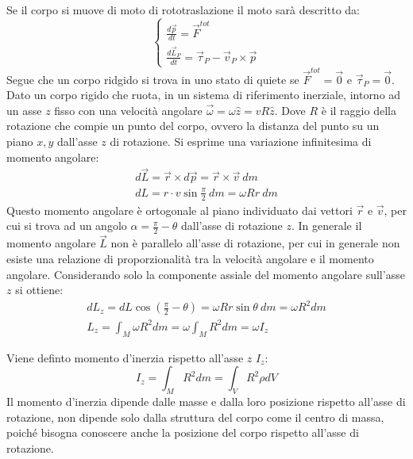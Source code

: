 \documentclass{article}
\numberwithin{equation}{subsection}
\begin{document}
Se il corpo si muove di moto di rototraslazione il moto sarà descritto da:
\begin{equation}
    \begin{cases}
        \displaystyle\frac{d\vec{p}}{dt}=\vec{F}^{tot}\\
        \displaystyle\frac{d\vec{L}_P}{dt}=\vec{\tau}_P-\vec{v}_P\times\vec{p}
    \end{cases}
\end{equation}
Segue che un corpo ridgido si trova in uno stato di quiete se 
$\vec{F}^{tot}=\vec{0}$ e $\vec{\tau}_P=\vec{0}$. 
\\
Dato un corpo rigido che ruota, in un sistema di riferimento inerziale, intorno ad un asse $z$ fisso con una 
velocità angolare $\vec{\omega}=\omega\hat{z}=vR\hat{z}$. Dove 
$R$ è il raggio della rotazione che compie un punto del corpo, ovvero la distanza del punto su un piano $x,y$ 
dall'asse $z$ di rotazione. Si esprime una variazione infinitesima di momento angolare: 
\begin{gather*}
    d\vec{L}=\vec{r}\times d\vec{p}=\vec{r}\times\vec{v}\:dm\\
    dL=r\cdot v\sin\displaystyle\frac{\pi}{2}\:dm=\omega Rr\:dm
\end{gather*}
Questo momento angolare è ortogonale al piano individuato dai vettori $\vec{r}$ e $\vec{v}$, per cui si trova ad un angolo $\alpha=\displaystyle\frac{\pi}{2}-\theta$ dall'asse 
di rotazione $z$. In generale il momento angolare $\vec{L}$ non è parallelo all'asse di rotazione, per cui in generale non esiste una relazione di proporzionalità tra la velocità angolare 
e il momento angolare. Considerando solo la componente assiale del momento angolare sull'asse $z$ si ottiene: 
\begin{gather*}
    dL_z=dL\cos\left(\displaystyle\frac{\pi}{2}-\theta\right)=\omega Rr\sin\theta\:dm=\omega R^2dm\\
    L_z=\displaystyle\int_M\omega R^2dm=\omega\int_M R^2dm=\omega I_z
\end{gather*}

Viene definto momento d'inerzia rispetto all'asse $z$ $I_z$: 
\begin{equation}
    I_z=\displaystyle\int_M R^2dm=\int_V R^2\rho dV
\end{equation}
Il momento d'inerzia dipende dalle masse e dalla loro posizione rispetto all'asse di rotazione, non dipende solo dalla struttura del corpo come il centro di massa, poiché 
bisogna conoscere anche la posizione del corpo rispetto all'asse di rotazione. 
\end{document}
